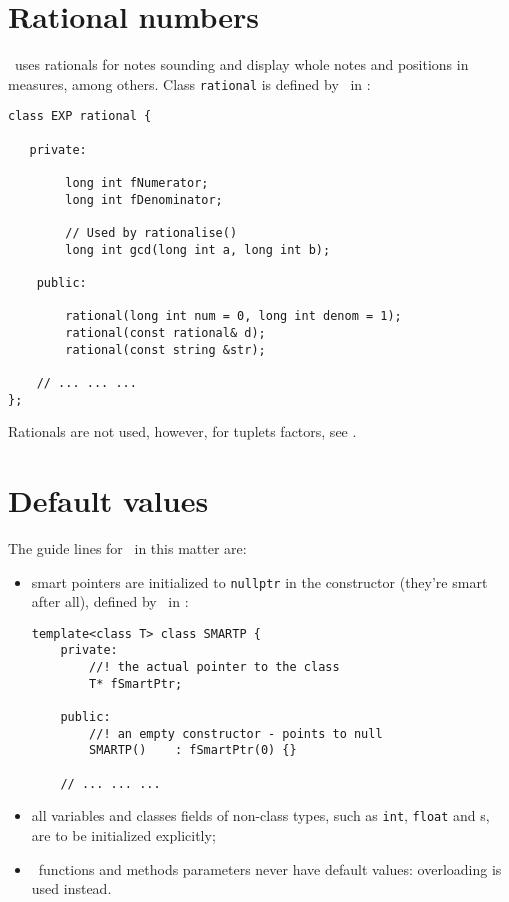\section{Rational numbers}

\mf\ uses rationals for notes sounding and display whole notes and positions in measures, among others.
Class {\tt rational} is defined by \libmusicxml\ in :
\begin{lstlisting}[language=CPlusPlus]
class EXP rational {

   private:

        long int fNumerator;
        long int fDenominator;

        // Used by rationalise()
        long int gcd(long int a, long int b);

    public:

        rational(long int num = 0, long int denom = 1);
        rational(const rational& d);
        rational(const string &str);

	// ... ... ...
};
\end{lstlisting}

Rationals are not used, however, for tuplets factors, see .


\section{Default values}

The guide lines for \mf\ in this matter are:
\begin{itemize}
\item smart pointers are initialized to {\tt nullptr} in the  constructor (they're smart after all), defined by \libmusicxml\ in :
\begin{lstlisting}[language=CPlusPlus]
template<class T> class SMARTP {
	private:
		//! the actual pointer to the class
		T* fSmartPtr;

	public:
		//! an empty constructor - points to null
		SMARTP()	: fSmartPtr(0) {}

	// ... ... ...
\end{lstlisting}

\item all variables and classes fields of non-class types, such as {\tt int}, {\tt float} and \enumType s, are to be initialized explicitly;

\item \mf\ functions and methods parameters never have default values: overloading is used instead.
\end{itemize}


